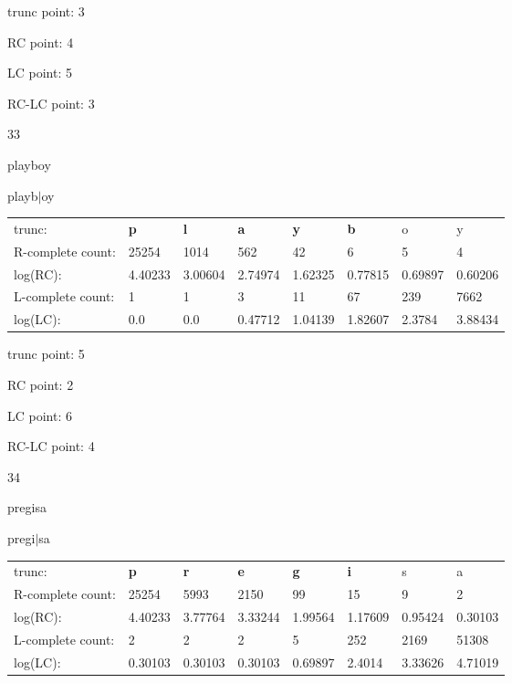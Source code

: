 \documentclass{article}
\begin{document}
trunc point: 3

RC point: 4

LC point: 5

RC-LC point: 3

\vspace{3em}



33

playboy

playb$|$oy

\vspace{1em}

\begin{tabular}{l|lllllll}

trunc: & {\color{red}\bf p} & {\color{red}\bf l} & {\color{red}\bf a} & {\color{red}\bf y} & {\color{red}\bf b} & o & y \\ 
R-complete count: & 25254 & 1014 & 562 & 42 & 6 & 5 & 4 \\ 
log(RC): & 4.40233 & 3.00604 & 2.74974 & 1.62325 & 0.77815 & 0.69897 & 0.60206 \\ 
L-complete count: & 1 & 1 & 3 & 11 & 67 & 239 & 7662 \\ 
log(LC): & 0.0 & 0.0 & 0.47712 & 1.04139 & 1.82607 & 2.3784 & 3.88434 \\ 
\end{tabular}

trunc point: 5

RC point: 2

LC point: 6

RC-LC point: 4

\vspace{3em}



34

pregisa

pregi$|$sa

\vspace{1em}

\begin{tabular}{l|lllllll}

trunc: & {\color{red}\bf p} & {\color{red}\bf r} & {\color{red}\bf e} & {\color{red}\bf g} & {\color{red}\bf i} & s & a \\ 
R-complete count: & 25254 & 5993 & 2150 & 99 & 15 & 9 & 2 \\ 
log(RC): & 4.40233 & 3.77764 & 3.33244 & 1.99564 & 1.17609 & 0.95424 & 0.30103 \\ 
L-complete count: & 2 & 2 & 2 & 5 & 252 & 2169 & 51308 \\ 
log(LC): & 0.30103 & 0.30103 & 0.30103 & 0.69897 & 2.4014 & 3.33626 & 4.71019 \\ 
\end{tabular}
\end{document}
